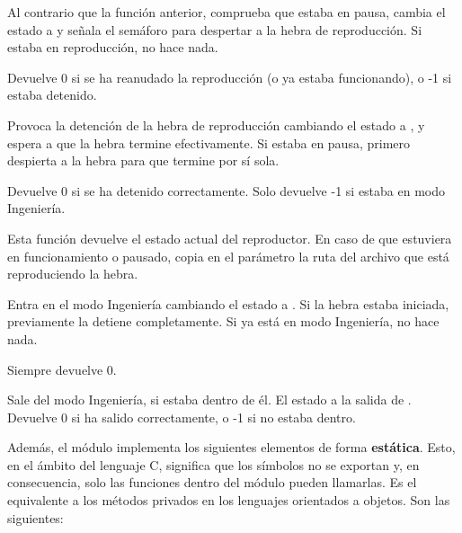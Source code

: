\begin{description}[style=nextline]
	\item[\code{int player\_resume()}]
	
	Al contrario que la función anterior, comprueba que estaba en pausa, cambia el estado a  y señala el semáforo para despertar a la hebra de reproducción. Si estaba en reproducción, no hace nada. 
	
	Devuelve 0 si se ha reanudado la reproducción (o ya estaba funcionando), o -1 si estaba detenido.
	
	\item[\code{int player\_stop()}]
	
	Provoca la detención de la hebra de reproducción cambiando el estado a , y espera a que la hebra termine efectivamente. Si estaba en pausa, primero despierta a la hebra para que termine por sí sola.
	
	Devuelve 0 si se ha detenido correctamente. Solo devuelve -1 si estaba en modo Ingeniería.
	
	\item[\code{player\_state\_t player\_state(char *file)}]
	
	Esta función devuelve el estado actual del reproductor. En caso de que estuviera en funcionamiento o pausado, copia en el parámetro  la ruta del archivo que está reproduciendo la hebra.
	
	\item[\code{int player\_engineer\_enter()}]
	
	Entra en el modo Ingeniería cambiando el estado a . Si la hebra estaba iniciada, previamente la detiene completamente. Si ya está en modo Ingeniería, no hace nada.
	
	Siempre devuelve 0.
	
	\item[\code{int player\_engineer\_exit()}]
	
	Sale del modo Ingeniería, si estaba dentro de él. El estado a la salida de . Devuelve 0 si ha salido correctamente, o -1 si no estaba dentro.
\end{description}

Además, el módulo implementa los siguientes elementos de forma \textbf{estática}. Esto, en el ámbito del lenguaje C, significa que los símbolos no se exportan y, en consecuencia, solo las funciones dentro del módulo pueden llamarlas. Es el equivalente a los métodos privados en los lenguajes orientados a objetos. Son las siguientes:

